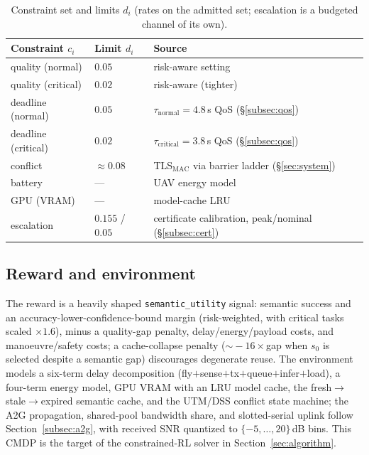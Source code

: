 \begin{table}[t]
\centering
\caption{Constraint set and limits $d_i$ (rates on the admitted set;
escalation is a budgeted channel of its own).}
\label{tab:constraints}
\footnotesize
\begin{tabular}{@{}llp{3.1cm}@{}}
\toprule
Constraint $c_i$ & Limit $d_i$ & Source \\
\midrule
quality (normal)   & $0.05$ & risk-aware setting \\
quality (critical) & $0.02$ & risk-aware (tighter) \\
deadline (normal)  & $0.05$ & $\tau_{\mathrm{normal}}{=}4.8$\,s QoS (§\ref{subsec:qos}) \\
deadline (critical)& $0.02$ & $\tau_{\mathrm{critical}}{=}3.8$\,s QoS (§\ref{subsec:qos}) \\
conflict           & $\approx0.08$ & TLS$_{\mathrm{MAC}}$ via barrier ladder (§\ref{sec:system}) \\
battery            & --- & UAV energy model \\
GPU (VRAM)         & --- & model-cache LRU \\
\midrule
escalation & $0.155$ / $0.05$ & certificate calibration, peak/nominal (§\ref{subsec:cert}) \\
\bottomrule
\end{tabular}
\end{table}

\subsection{Reward and environment}
The reward is a heavily shaped \texttt{semantic\_utility} signal: semantic
success and an accuracy-lower-confidence-bound margin (risk-weighted, with
critical tasks scaled $\times1.6$), minus a quality-gap penalty,
delay/energy/payload costs, and manoeuvre/safety costs; a
cache-collapse penalty ($\sim\!-16\times$gap when $s_0$ is selected despite
a semantic gap) discourages degenerate reuse. The environment models a
six-term delay decomposition (fly$+$sense$+$tx$+$queue$+$infer$+$load),
a four-term energy model, GPU VRAM with an LRU model cache, the
fresh$\to$stale$\to$expired semantic cache, and the UTM/DSS conflict state
machine; the A2G propagation, shared-pool bandwidth share, and
slotted-serial uplink follow Section~\ref{subsec:a2g}, with received SNR
quantized to $\{-5,\dots,20\}$\,dB bins. This CMDP is the target of the
constrained-RL solver in Section~\ref{sec:algorithm}.
